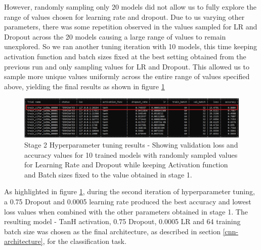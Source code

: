 \documentclass{l4proj}
\begin{document}
However, randomly sampling only 20 models did not allow us to fully explore the range of values chosen for learning rate and dropout. Due to us varying other parameters, there was some repetition observed in the values sampled for LR and Dropout across the 20 models causing a large range of values to remain unexplored. So we ran another tuning iteration with 10 models, this time keeping activation function and batch sizes fixed at the best setting obtained from the previous run and only sampling values for LR and Dropout. This allowed us to sample more unique values uniformly across the entire range of values specified above, yielding the final results as shown in figure \ref{fig:tuning-stage-2}

\begin{figure}[h]
    \centering
    \includegraphics[scale=0.4]{images/tuning-stage2.png}
    \caption{Stage 2 Hyperparameter tuning results - Showing validation loss and accuracy values for 10 trained models with randomly sampled values for Learning Rate and Dropout while keeping Activation function and Batch sizes fixed to the value obtained in stage 1. }
    \label{fig:tuning-stage-2}
\end{figure}

As highlighted in figure \ref{fig:tuning-stage-2}, during the second iteration of hyperparameter tuning, a 0.75 Dropout and 0.0005 learning rate produced the best accuracy and lowest loss values when combined with the other parameters obtained in stage 1. The resulting model - TanH activation, 0.75 Dropout, 0.0005 LR and 64 training batch size was chosen as the final architecture, as described in section \ref{cnn-architecture}, for the classification task.
\end{document}
